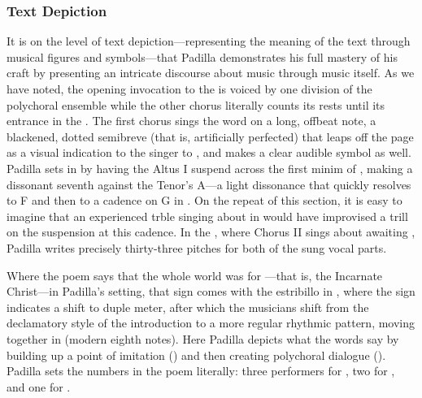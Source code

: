 \subsubsection{Text Depiction}

It is on the level of text depiction---representing the meaning of the text
through musical figures and symbols---that Padilla demonstrates his full mastery
of his craft by presenting an intricate discourse about music through music
itself.
As we have noted, the opening invocation to the  is voiced by one division of the polychoral
ensemble while the other chorus literally counts its rests until its entrance in
the .
The first chorus sings the word  on a long, offbeat note, a
blackened, dotted semibreve (that is, artificially perfected) that leaps off the
page as a visual indication to the singer to , and makes a
clear audible symbol as well.
Padilla sets  in  by having the
Altus I suspend across the first minim of , making a dissonant
seventh against the Tenor's A---a light dissonance that quickly resolves to
F\sh{} and then to a cadence on G in .
On the repeat of this section, it is easy to imagine that an experienced trble
singing about  in  would have
improvised a trill on the suspension at this cadence.%
    \Autocite
    [See Cerone's isntructions for improvisng ornaments at cadences]
    [545--546]
    {Cerone:Melopeo}
In the , where Chorus II sings about awaiting , Padilla writes precisely thirty-three pitches for both of the
sung vocal parts.

Where the poem says that the whole world was  for ---that is, the Incarnate Christ---in Padilla's setting, that sign comes
with the estribillo in , where the \meterC{} sign indicates a shift
to duple meter, after which the musicians shift from the declamatory style of
the introduction to a more regular rhythmic pattern, moving together in
 (modern eighth notes).
Here Padilla depicts what the words say by building up a point of imitation
 () and then creating
polychoral dialogue ().
Padilla sets the numbers in the poem literally: three performers for
, two for , and one for . %

